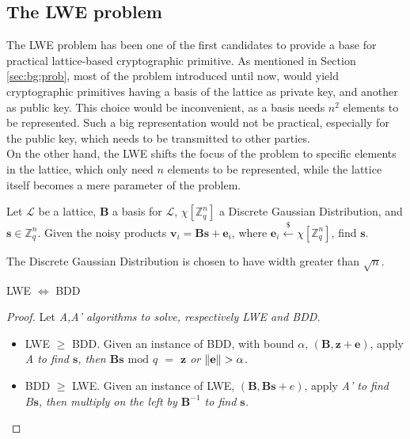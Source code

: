 \subsection{The LWE problem}
The LWE problem has been one of the first candidates to provide a base for practical lattice-based cryptographic primitive. As mentioned in Section \ref{sec:bg:prob}, most of the problem introduced until now, would yield cryptographic primitives having a basis of the lattice as private key, and another as public key. This choice would be inconvenient, as a basis needs $n^2$ elements to be represented. Such a big representation would not be practical, especially for the public key, which needs to be transmitted to other parties.\\
On the other hand, the LWE shifts the focus of the problem to specific elements in the lattice, which only need $n$ elements to be represented, while the lattice itself becomes a mere parameter of the problem.\\


\begin{definition}
Let $\mathscr{L}$ be a lattice, $\mathbf{B}$ a basis for $\mathscr{L}$, $\chi[\mathbb{Z}_q^n]$ a Discrete Gaussian Distribution, and $\mathbf{s}\in\mathbb{Z}_q^n$. Given the noisy products $\mathbf{v}_i=\mathbf{Bs} + \mathbf{e}_i$, where $\mathbf{e}_i\xleftarrow{\$}\chi[\mathbb{Z}_q^n]$, find $\mathbf{s}$.
\end{definition}

\begin{remark}
The Discrete Gaussian Distribution is chosen to have width greater than $\sqrt{n}$.
\end{remark}

\begin{theorem}
LWE $\Leftrightarrow$ BDD
\end{theorem}
\begin{proof}
Let \it{A},\it{A'} algorithms to solve, respectively LWE and BDD.
\begin{itemize}
\item LWE $\geq$ BDD. Given an instance of BDD, with bound $\alpha$, $(\mathbf{B},\mathbf{z}+\mathbf{e})$, apply \it{A} to find $\mathbf{s}$, then $\mathbf{Bs}$ $\mathrm{mod}$ $q$ $=$ $\mathbf{z}$ or $\left\lVert \mathbf{e} \right\rVert>\alpha$.
\item BDD $\geq$ LWE. Given an instance of LWE, $(\mathbf{B},\mathbf{Bs}+e)$, apply \it{A'} to find $B\mathbf{s}$, then multiply on the left by $\mathbf{B}^{-1}$ to find $\mathbf{s}$.
\end{itemize}
\end{proof}

